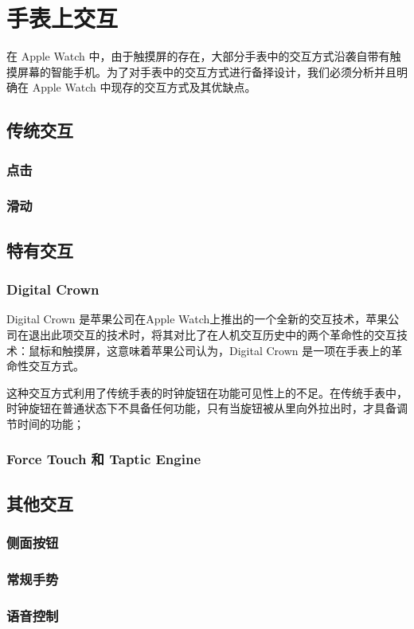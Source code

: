 \chapter{手表上交互}

\quad\quad 在 Apple Watch 中，由于触摸屏的存在，大部分手表中的交互方式沿袭自带有触摸屏幕的智能手机。为了对手表中的交互方式进行备择设计，我们必须分析并且明确在 Apple Watch 中现存的交互方式及其优缺点。

\section{传统交互}

\subsection{点击}

\subsection{滑动}

\section{特有交互}

\subsection{Digital Crown}

Digital Crown 是苹果公司在Apple Watch上推出的一个全新的交互技术，苹果公司在退出此项交互的技术时，将其对比了在人机交互历史中的两个革命性的交互技术：鼠标和触摸屏，这意味着苹果公司认为，Digital Crown 是一项在手表上的革命性交互方式。

这种交互方式利用了传统手表的时钟旋钮在功能可见性上的不足。在传统手表中，时钟旋钮在普通状态下不具备任何功能，只有当旋钮被从里向外拉出时，才具备调节时间的功能；

\subsection{Force Touch 和 Taptic Engine}

\section{其他交互}

\subsection{侧面按钮}

\subsection{常规手势}

\subsection{语音控制}
